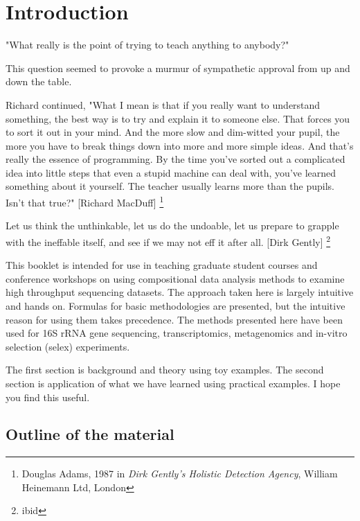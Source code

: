 \documentclass[onecolumn]{book}
\let\rmarkdownfootnote\footnote%
\def\footnote{\protect\rmarkdownfootnote}
\theoremstyle{definition}
\theoremstyle{definition}
\theoremstyle{definition}
\theoremstyle{remark}
\begin{document}
\hypertarget{intro}{%
\chapter{Introduction}\label{intro}}

\hspace{2cm}\begin{minipage}[ct]{10cm}
\parskip=5pt
\parindent=5pt

"What really is the point of trying to teach anything to anybody?"

This question seemed to provoke a murmur of sympathetic approval from up and down the table.

 Richard continued, "What I mean is that if you really want to understand something, the best way is to try and explain it to someone else. That forces you to sort it out in your mind. And the more slow and dim-witted your pupil, the more you have to break things down into more and more simple ideas. And that's really the essence of programming. By the time you've sorted out a complicated idea into little steps that even a stupid machine can deal with, you've learned something about it yourself. The teacher usually learns more than the pupils. Isn't that true?" [Richard MacDuff] \footnote{Douglas Adams, 1987 in \emph{Dirk Gently's Holistic Detection Agency},  William Heinemann Ltd, London}

 \vspace{1cm}
 Let us think the unthinkable, let us do the undoable, let us prepare to grapple with the ineffable itself, and see if we may not eff it after all. [Dirk Gently] \footnote{ibid}

\end{minipage}

This booklet is intended for use in teaching graduate student courses
and conference workshops on using compositional data analysis methods to
examine high throughput sequencing datasets. The approach taken here is
largely intuitive and hands on. Formulas for basic methodologies are
presented, but the intuitive reason for using them takes precedence. The
methods presented here have been used for 16S rRNA gene sequencing,
transcriptomics, metagenomics and in-vitro selection (selex)
experiments.

The first section is background and theory using toy examples. The
second section is application of what we have learned using practical
examples. I hope you find this useful.

\hypertarget{outline-of-the-material}{%
\section{Outline of the material}\label{outline-of-the-material}}
\end{document}

